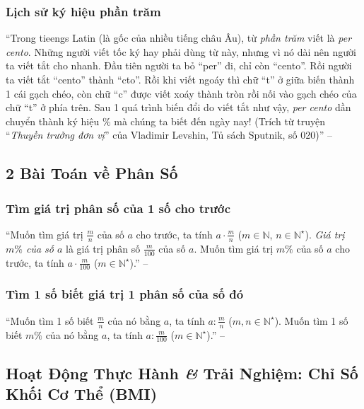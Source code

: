 \documentclass{article}
\numberwithin{equation}{section}
\begin{document}
\subsubsection{Lịch sử ký hiệu phần trăm}
``Trong tieengs Latin (là gốc của nhiều tiếng châu Âu), từ \textit{phần trăm} viết là \textit{per cento}. Những người viết tốc ký hay phải dùng từ này, nhưng vì nó dài nên người ta viết tắt cho nhanh. Đầu tiên người ta bỏ ``per'' đi, chỉ còn ``cento''. Rồi người ta viết tắt ``cento'' thành ``cto''. Rồi khi viết ngoáy thì chữ ``t'' ở giữa biến thành 1 cái gạch chéo, còn chữ ``c'' được viết xoáy thành tròn rồi nối vào gạch chéo của chữ ``t'' ở phía trên. Sau 1 quá trình biến đổi do viết tắt như vậy, \textit{per cento} dần chuyển thành ký hiệu \% mà chúng ta biết đến ngày nay! (Trích từ truyện ``\textit{Thuyền trưởng đơn vị}'' của Vladimir Levshin, Tủ sách Sputnik, số 020)'' -- \cite[p. 66]{SGK_Toan_6_Canh_Dieu_tap_2}


\subsection{2 Bài Toán về Phân Số}

\subsubsection{Tìm giá trị phân số của 1 số cho trước}
``Muốn tìm giá trị $\frac{m}{n}$ của số $a$ cho trước, ta tính $a\cdot\frac{m}{n}$ ($m\in\mathbb{N}$, $n\in\mathbb{N}^\star$). \emph{Giá trị $m\%$ của số $a$} là giá trị phân số $\frac{m}{100}$ của số $a$. Muốn tìm giá trị $m\%$ của số $a$ cho trước, ta tính $a\cdot\frac{m}{100}$ ($m\in\mathbb{N}^\star$).'' -- \cite[p. 68]{SGK_Toan_6_Canh_Dieu_tap_2}

\subsubsection{Tìm 1 số biết giá trị 1 phân số của số đó}
``Muốn tìm 1 số biết $\frac{m}{n}$ của nó bằng $a$, ta tính $a:\frac{m}{n}$ ($m,n\in\mathbb{N}^\star$). Muốn tìm 1 số biết $m\%$ của nó bằng $a$, ta tính $a:\frac{m}{100}$ ($m\in\mathbb{N}^\star$).'' -- \cite[p. 68]{SGK_Toan_6_Canh_Dieu_tap_2}


\subsection{Hoạt Động Thực Hành \textit{\&} Trải Nghiệm: Chỉ Số Khối Cơ Thể (BMI)}
\end{document}
